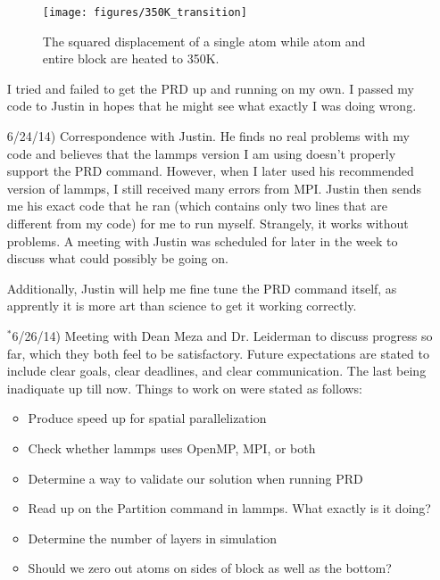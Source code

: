 \documentclass[12pt]{article}
\begin{document}
\begin{itemize}
\begin{figure}
\begin{center}
 \texttt{[image: figures/350K\_transition]}
 \caption{The squared displacement of a single atom while atom and entire block are heated to 350K.}
 \label{350K_right}
 \end{center}
\end{figure}

I tried and failed to get the PRD up and running on my own.  I passed my code to Justin in hopes that he might see what exactly I was doing wrong.


\item[6/24/14)]  Correspondence with Justin.  He finds no real problems with my code and believes that the lammps version I am using doesn't properly support the PRD command.  However, when I later used his recommended version of lammps, I still received many errors from MPI.  Justin then sends me his exact code that he ran (which contains only two lines that are different from my code) for me to run myself.  Strangely, it works without problems.  A meeting with Justin was scheduled for later in the week to discuss what could possibly be going on.  

Additionally, Justin will help me fine tune the PRD command itself, as apprently it is more art than science to get it working correctly.

\item[$^*$6/26/14)] Meeting with Dean Meza and Dr. Leiderman to discuss progress so far, which they both feel to be satisfactory.  Future expectations are stated to include clear goals, clear deadlines, and clear communication.  The last being inadiquate up till now.  Things to work on were stated as follows:

\begin{itemize}
 \item Produce speed up for spatial parallelization
 \item Check whether lammps uses OpenMP, MPI, or both
 \item Determine a way to validate our solution when running PRD
 \item Read up on the Partition command in lammps.  What exactly is it doing?
 \item Determine the number of layers in simulation
 \item Should we zero out atoms on sides of block as well as the bottom?
\end{itemize}





\end{itemize}

\end{document}
